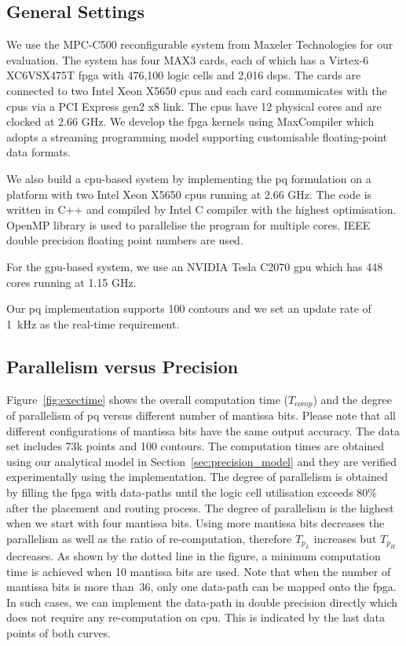 \subsection{General Settings}
We use the MPC-C500 reconfigurable system from Maxeler Technologies for our evaluation.
The system has four MAX3 cards, each of which has a Virtex-6 XC6VSX475T \gls{fpga} with 476,100 logic cells and 2,016 \glspl{dsp}.
The cards are connected to two Intel Xeon X5650 \gls{cpu}s and each card communicates with the \gls{cpu}s via a PCI Express gen2 x8 link. 
The \gls{cpu}s have 12 physical cores and are clocked at 2.66 GHz.
We develop the \gls{fpga} kernels using MaxCompiler which adopts a streaming programming model supporting customisable floating-point data formats.

We also build a \gls{cpu}-based system by implementing the \gls{pq} formulation on a platform with two Intel Xeon X5650 \gls{cpu}s running at 2.66 GHz.
The code is written in C++ and compiled by Intel C compiler with the highest optimisation.
OpenMP library is used to parallelise the program for multiple cores.
IEEE double precision floating point numbers are used.

For the \gls{gpu}-based system, we use an NVIDIA Tesla C2070 \gls{gpu} which has 448 cores running at 1.15 GHz.

Our \gls{pq} implementation supports 100 contours and we set an update rate of 1~kHz as the real-time requirement.

\subsection{Parallelism versus Precision}
\label{sec:precision_parallelism}

Figure~\ref{fig:exectime} shows the overall computation time ($T_{comp}$)
and the degree of parallelism of \gls{pq} versus different number of mantissa bits.
Please note that all different configurations of mantissa bits have the same output accuracy.
The data set includes 73k points and 100 contours.
The computation times are obtained using our analytical model in Section~\ref{sec:precision_model} and they are verified experimentally using the implementation.
The degree of parallelism is obtained by filling the \gls{fpga} with data-paths until the logic cell utilisation exceeds 80\% after the placement and routing process.
The degree of parallelism is the highest when we start with four mantissa bits.
Using more mantissa bits decreases the parallelism as well as the ratio of re-computation, therefore $T_{p_L}$ increases but $T_{p_H}$ decreases.
As shown by the dotted line in the figure, a minimum computation time is achieved when 10 mantissa bits are used.
Note that when the number of mantissa bits is more than~36, only one data-path can be mapped onto the \gls{fpga}.
In such cases, we can implement the data-path in double precision directly which does not require any re-computation on \gls{cpu}.
This is indicated by the last data points of both curves.

